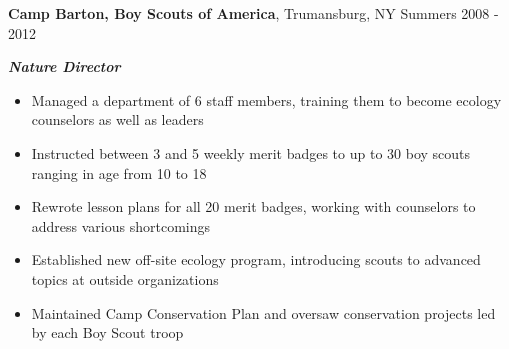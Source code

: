 
\vspace{7pt}

\textbf{Camp Barton, Boy Scouts of America}, Trumansburg, NY \hfill Summers 2008 - 2012

\textbf{\textit{Nature Director}}

\begin{itemize}
    \item Managed a department of 6 staff members, training them to become ecology counselors as well as leaders
    \item Instructed between 3 and 5 weekly merit badges to up to 30 boy scouts ranging in age from 10 to 18
    \item Rewrote lesson plans for all 20 merit badges, working with counselors to address various shortcomings
    \item Established new off-site ecology program, introducing scouts to advanced topics at outside organizations
    \item Maintained Camp Conservation Plan and oversaw conservation projects led by each Boy Scout troop
\end{itemize}

